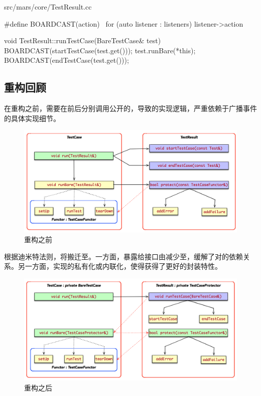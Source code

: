 \begin{content}
\begin{nodiff}{src/mars/core/TestResult.cc}
\begin{c++}
#define BOARDCAST(action) \
  for (auto listener : listeners) listener->action

void TestResult::runTestCase(BareTestCase& test) {
  BOARDCAST(startTestCase(test.get()));
  test.runBare(*this);
  BOARDCAST(endTestCase(test.get()));
}
 \end{c++}
\end{nodiff}

\subsection{重构回顾}

在重构之前，需要在前后分别调用公开的，导致的实现逻辑，严重依赖于广播事件的具体实现细节。

\begin{figure}[H]
\centering
\includegraphics[width=1.0\textwidth]{figures/xunit/decoupling-1-1.png}
\caption{重构之前}
 \label{fig:decoupling-1-1-2}
\end{figure}

根据迪米特法则，将搬迁至。一方面，暴露给接口由减少至，缓解了对的依赖关系。另一方面，实现的私有化或内联化，使得获得了更好的封装特性。

\begin{figure}[H]
\centering
\includegraphics[width=1.0\textwidth]{figures/xunit/decoupling-1-2.png}
\caption{重构之后}
 \label{fig:decoupling-1-2}
\end{figure}


\end{content}

